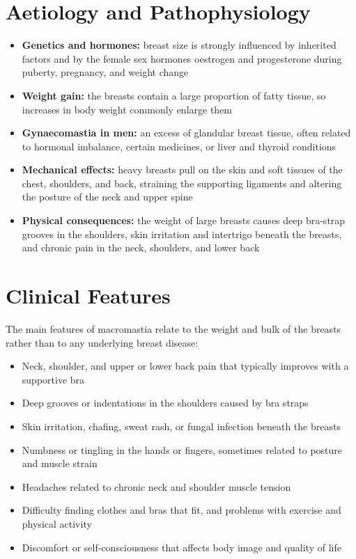 \section*{Aetiology and Pathophysiology}
\begin{itemize}
    \item \textbf{Genetics and hormones:} breast size is strongly influenced by inherited factors and by the female sex hormones oestrogen and progesterone during puberty, pregnancy, and weight change
    \item \textbf{Weight gain:} the breasts contain a large proportion of fatty tissue, so increases in body weight commonly enlarge them
    \item \textbf{Gynaecomastia in men:} an excess of glandular breast tissue, often related to hormonal imbalance, certain medicines, or liver and thyroid conditions
    \item \textbf{Mechanical effects:} heavy breasts pull on the skin and soft tissues of the chest, shoulders, and back, straining the supporting ligaments and altering the posture of the neck and upper spine
    \item \textbf{Physical consequences:} the weight of large breasts causes deep bra-strap grooves in the shoulders, skin irritation and intertrigo beneath the breasts, and chronic pain in the neck, shoulders, and lower back
\end{itemize}

\section*{Clinical Features}
The main features of macromastia relate to the weight and bulk of the breasts rather than to any underlying breast disease:

\begin{itemize}
    \item Neck, shoulder, and upper or lower back pain that typically improves with a supportive bra
    \item Deep grooves or indentations in the shoulders caused by bra straps
    \item Skin irritation, chafing, sweat rash, or fungal infection beneath the breasts
    \item Numbness or tingling in the hands or fingers, sometimes related to posture and muscle strain
    \item Headaches related to chronic neck and shoulder muscle tension
    \item Difficulty finding clothes and bras that fit, and problems with exercise and physical activity
    \item Discomfort or self-consciousness that affects body image and quality of life
\end{itemize}

